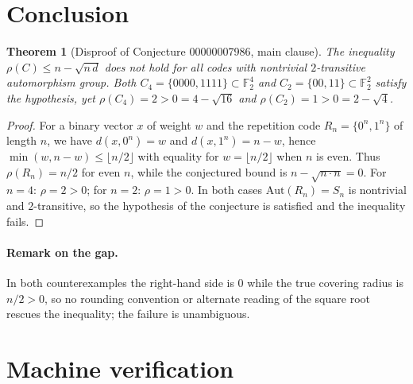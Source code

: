 \documentclass[11pt]{article}
\newtheorem{theorem}{Theorem}
\theoremstyle{definition}
\begin{document}
\section{Conclusion}

\begin{theorem}[Disproof of Conjecture 00000007986, main clause]
The inequality $\rho(C) \le n - \sqrt{n\,d}$ does not hold for all codes
with nontrivial $2$-transitive automorphism group. Both
$C_4 = \{0000,1111\} \subset \mathbb{F}_2^4$ and
$C_2 = \{00,11\} \subset \mathbb{F}_2^2$ satisfy the hypothesis, yet
$\rho(C_4) = 2 > 0 = 4-\sqrt{16}$ and $\rho(C_2) = 1 > 0 = 2-\sqrt{4}$.
\end{theorem}

\begin{proof}
For a binary vector $x$ of weight $w$ and the repetition code
$R_n = \{0^n, 1^n\}$ of length $n$, we have $d(x, 0^n) = w$ and
$d(x, 1^n) = n - w$, hence
$\min(w, n-w) \le \lfloor n/2 \rfloor$ with equality for
$w = \lfloor n/2 \rfloor$ when $n$ is even. Thus
$\rho(R_n) = n/2$ for even $n$, while the conjectured bound is
$n - \sqrt{n \cdot n} = 0$. For $n = 4$: $\rho = 2 > 0$;
for $n = 2$: $\rho = 1 > 0$. In both cases
$\mathrm{Aut}(R_n) = S_n$ is nontrivial and $2$-transitive, so the
hypothesis of the conjecture is satisfied and the inequality fails.
\end{proof}

\paragraph{Remark on the gap.}
In both counterexamples the right-hand side is $0$ while the true covering
radius is $n/2 > 0$, so no rounding convention or alternate reading of the
square root rescues the inequality; the failure is unambiguous.

\section{Machine verification}
\end{document}

